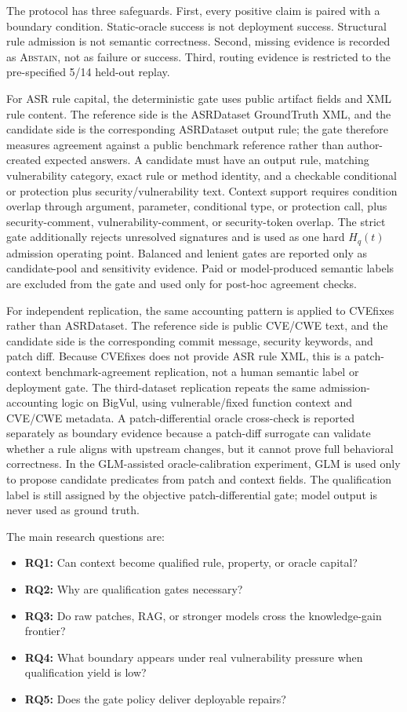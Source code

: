 ﻿\documentclass[lettersize,journal]{IEEEtran}
\begin{document}
The protocol has three safeguards. First, every positive claim is paired with a boundary condition. Static-oracle success is not deployment success. Structural rule admission is not semantic correctness. Second, missing evidence is recorded as \textsc{Abstain}, not as failure or success. Third, routing evidence is restricted to the pre-specified 5/14 held-out replay.

For ASR rule capital, the deterministic gate uses public artifact fields and XML rule content. The reference side is the ASRDataset GroundTruth XML, and the candidate side is the corresponding ASRDataset output rule; the gate therefore measures agreement against a public benchmark reference rather than author-created expected answers. A candidate must have an output rule, matching vulnerability category, exact rule or method identity, and a checkable conditional or protection plus security/vulnerability text. Context support requires condition overlap through argument, parameter, conditional type, or protection call, plus security-comment, vulnerability-comment, or security-token overlap. The strict gate additionally rejects unresolved signatures and is used as one hard $H_q(t)$ admission operating point. Balanced and lenient gates are reported only as candidate-pool and sensitivity evidence. Paid or model-produced semantic labels are excluded from the gate and used only for post-hoc agreement checks.

For independent replication, the same accounting pattern is applied to CVEfixes rather than ASRDataset. The reference side is public CVE/CWE text, and the candidate side is the corresponding commit message, security keywords, and patch diff. Because CVEfixes does not provide ASR rule XML, this is a patch-context benchmark-agreement replication, not a human semantic label or deployment gate. The third-dataset replication repeats the same admission-accounting logic on BigVul, using vulnerable/fixed function context and CVE/CWE metadata. A patch-differential oracle cross-check is reported separately as boundary evidence because a patch-diff surrogate can validate whether a rule aligns with upstream changes, but it cannot prove full behavioral correctness. In the GLM-assisted oracle-calibration experiment, GLM is used only to propose candidate predicates from patch and context fields. The qualification label is still assigned by the objective patch-differential gate; model output is never used as ground truth.

The main research questions are:
\begin{itemize}
    \item \textbf{RQ1:} Can context become qualified rule, property, or oracle capital?
    \item \textbf{RQ2:} Why are qualification gates necessary?
    \item \textbf{RQ3:} Do raw patches, RAG, or stronger models cross the knowledge-gain frontier?
    \item \textbf{RQ4:} What boundary appears under real vulnerability pressure when qualification yield is low?
    \item \textbf{RQ5:} Does the gate policy deliver deployable repairs?
\end{itemize}
\end{document}
